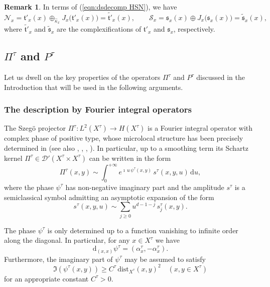 \documentclass[12pt,a4paper]{article}
\theoremstyle{plain}
\theoremstyle{definition}
\newtheorem{rem}[thm]{Remark}%
\begin{document}
\begin{rem}
\label{rem:NSsigma}
In terms of (\ref{eqn:dsdecomp HSN}), we have
$$
\mathcal{N}_x=\mathfrak{t}'_x(x)
\oplus_{\hat{\kappa}_x} J_x\big( \mathfrak{t}'_x(x) \big)=
\widetilde{\mathfrak{t}'}_x(x),
\qquad
\mathcal{S}_x=\mathfrak{s}_x(x)\oplus J_x\big(\mathfrak{s}_x(x)\big)=
\widetilde{\mathfrak{s}}_x(x),
$$
where $\widetilde{\mathfrak{t}'}_x$ and $\widetilde{\mathfrak{s}}_x$
are the complexifications of $\mathfrak{t}'_x$ and $\mathfrak{s}_x$,
respectively.
\end{rem}

\subsection{$\Pi^\tau$ and $P^\tau$}
\label{scnt:szego parametrix}


Let us dwell on the key properties of the operators $\Pi^\tau$ and $P^\tau$ discussed in the Introduction that will be used in the following arguments.


\subsubsection{The description by Fourier integral operators}


The Szeg\"{o} projector $\Pi^\tau:L^2(X^\tau)\rightarrow H(X^\tau)$
is a Fourier integral operator with complex phase of positive type, whose
microlocal structure has been precisely determined in \cite{bs}
(see also \cite{feff}, \cite{ms}, \cite{bg}, \cite{sz}). 
In particular,
up to a smoothing term its Schartz kernel 
$\Pi^\tau\in \mathcal{D}'(X^\tau\times X^\tau)$
can be written in the form
\begin{equation}
\label{eqn:szego ker}
\Pi^\tau(x,y)\sim \int_0^{+\infty}e^{\imath\,u\,\psi^\tau(x,y)}\,
s^\tau(x,y,u)\,\mathrm{d}u,
\end{equation}
where the phase $\psi^\tau$ has non-negative imaginary part and the
amplitude $s^\tau$ is a semiclassical symbol admitting
an asymptotic expansion of the form
\begin{equation}
\label{eqn:amplitude pi}
s^\tau(x,y,u)\sim \sum_{j\ge 0}u^{d-1-j}\,s_j^\tau(x,y).
\end{equation}

%
The phase $\psi^\tau$ is only determined up to a function vanishing to infinite order along the diagonal. In particular, for any
$x\in X^\tau$ we have 
%
\begin{equation}
\label{eqn:diagonal diff psi}
\mathrm{d}_{(x,x)}\psi^\tau=(\alpha^\tau_x,-\alpha^\tau_x).
\end{equation}
Furthermore, 
the imaginary part of $\psi^\tau$ may be assumed to satisfy
\begin{equation}
\label{eqn:bd dist psitau xy}
\Im \left(\psi^\tau(x,y)\right)\ge C^\tau\,\mathrm{dist}_{X^\tau}
(x,y)^2\quad (x,y\in X^\tau)
\end{equation}
for an appropriate constant $C^\tau>0$.
\end{document}
